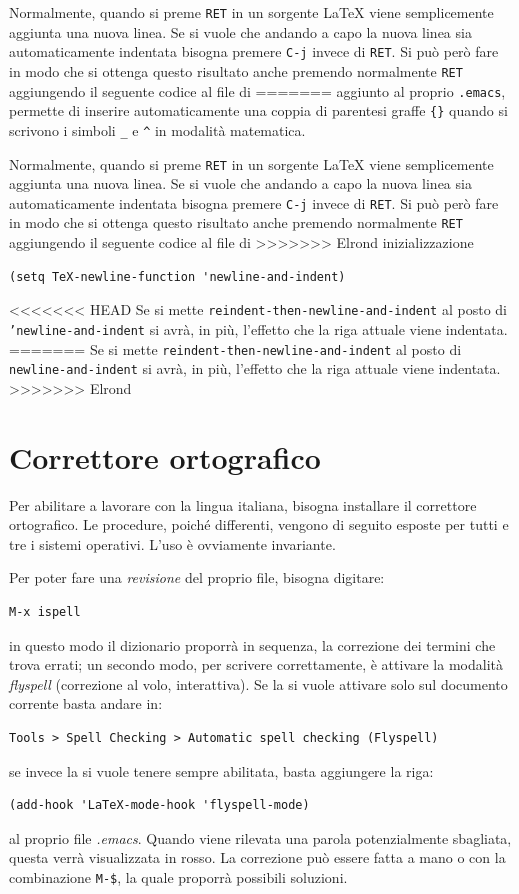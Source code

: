 \documentclass[11pt,a4paper]{article}
\begin{document}
Normalmente, quando si preme \texttt{RET} in un sorgente \LaTeX{}
viene semplicemente aggiunta una nuova linea.  Se si vuole che andando a capo la
nuova linea sia automaticamente indentata bisogna premere \texttt{C-j} invece di
\texttt{RET}.  Si può però fare in modo che si ottenga questo risultato anche
premendo normalmente \texttt{RET} aggiungendo il seguente codice al file di
=======
aggiunto al proprio \verb!.emacs!, permette di inserire automaticamente una
coppia di parentesi graffe \verb!{}! quando si scrivono i simboli \verb!_! e
\verb!^! in modalità matematica.

Normalmente, quando si preme \verb!RET! in un sorgente \LaTeX{}
viene semplicemente aggiunta una nuova linea.  Se si vuole che andando a capo la
nuova linea sia automaticamente indentata bisogna premere \verb!C-j! invece di
\verb!RET!.  Si può però fare in modo che si ottenga questo risultato anche
premendo normalmente \verb!RET! aggiungendo il seguente codice al file di
>>>>>>> Elrond
inizializzazione
\begin{Verbatim}
(setq TeX-newline-function 'newline-and-indent)
\end{Verbatim}
<<<<<<< HEAD
Se si mette \texttt{reindent-then-newline-and-indent} al posto di
\texttt{'newline-and-indent} si avrà, in più, l'effetto che la riga attuale
viene indentata.
=======
Se si mette \verb!reindent-then-newline-and-indent! al posto di
\verb!newline-and-indent! si avrà, in più, l'effetto che la riga attuale viene
indentata.
>>>>>>> Elrond

\section{Correttore ortografico}
\label{sec:corr}
Per abilitare \emacs{} a lavorare con la lingua italiana, bisogna
installare il correttore ortografico. Le procedure, poiché differenti,
vengono di seguito esposte per tutti e tre i sistemi operativi.  L'uso
è ovviamente invariante.

Per poter fare una \emph{revisione} del proprio file, bisogna
digitare:
\begin{Verbatim}
M-x ispell
\end{Verbatim}
in questo modo il dizionario proporrà in sequenza, la correzione dei
termini che trova errati; un secondo modo, per scrivere correttamente,
è attivare la modalità \emph{flyspell} (correzione al volo,
interattiva). Se la si vuole attivare solo sul documento corrente
basta andare in:
\begin{Verbatim}
Tools > Spell Checking > Automatic spell checking (Flyspell)
\end{Verbatim}
se invece la si vuole tenere sempre abilitata, basta aggiungere la
riga:
\begin{Verbatim}
(add-hook 'LaTeX-mode-hook 'flyspell-mode)
\end{Verbatim}
al proprio file \emph{.emacs}. Quando viene rilevata una parola
potenzialmente sbagliata, questa verrà visualizzata in rosso. La
correzione può essere fatta a mano o con la combinazione \verb!M-$!,
la quale proporrà possibili soluzioni.
\end{document}
